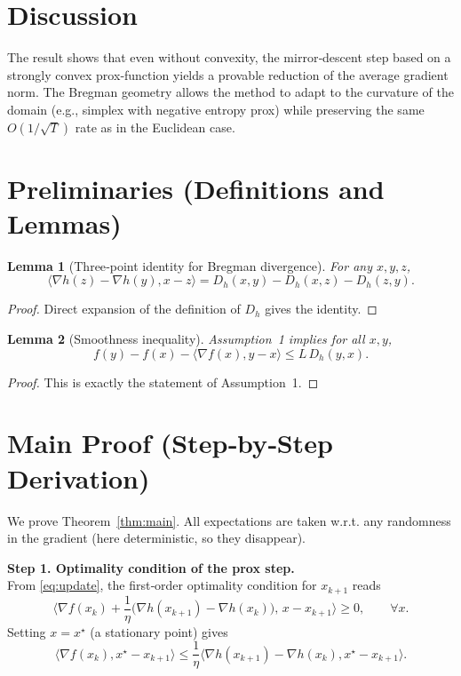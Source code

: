 \documentclass{article}
\newtheorem{lemma}{Lemma}
\begin{document}
\section*{Discussion}
The result shows that even without convexity, the mirror‑descent step based on a strongly convex prox‑function yields a provable reduction of the average gradient norm. The Bregman geometry allows the method to adapt to the curvature of the domain (e.g., simplex with negative entropy prox) while preserving the same $O(1/\sqrt{T})$ rate as in the Euclidean case.

\newpage
\section*{Preliminaries (Definitions and Lemmas)}
\begin{lemma}[Three‑point identity for Bregman divergence]\label{lem:3pt}
For any $x,y,z$,
\[
\langle\nabla h(z)-\nabla h(y),x-z\rangle
= D_h(x,y)-D_h(x,z)-D_h(z,y).
\]
\end{lemma}
\begin{proof}
Direct expansion of the definition of $D_h$ gives the identity. \hfill\qedhere
\end{proof}

\begin{lemma}[Smoothness inequality]\label{lem:smooth}
Assumption~1 implies for all $x,y$,
\[
f(y)-f(x)-\langle\nabla f(x),y-x\rangle\le L\,D_h(y,x).
\]
\end{lemma}
\begin{proof}
This is exactly the statement of Assumption~1. \hfill\qedhere
\end{proof}

\section*{Main Proof (Step‑by‑Step Derivation)}
We prove Theorem~\ref{thm:main}. All expectations are taken w.r.t. any randomness in the gradient (here deterministic, so they disappear).

\noindent\textbf{Step 1. Optimality condition of the prox step.}\\
From \eqref{eq:update}, the first‑order optimality condition for $x_{k+1}$ reads
\begin{equation}
\langle\nabla f(x_k)+\frac{1}{\eta}\big(\nabla h(x_{k+1})-\nabla h(x_k)\big),\,x-x_{k+1}\rangle\ge0,\qquad\forall x.
\label{eq:opt}
\end{equation}
Setting $x=x^{\star}$ (a stationary point) gives
\[
\langle\nabla f(x_k),x^{\star}-x_{k+1}\rangle
\le\frac{1}{\eta}\langle\nabla h(x_{k+1})-\nabla h(x_k),x^{\star}-x_{k+1}\rangle .
\tag{S1}
\]
\end{document}
